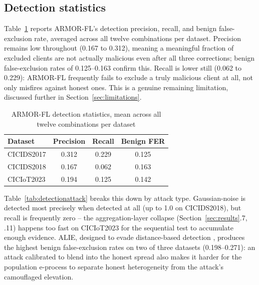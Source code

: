 \documentclass[pdflatex,iicol,sn-mathphys-num]{sn-jnl}%
\theoremstyle{thmstyleone}%
\theoremstyle{thmstyletwo}%
\theoremstyle{thmstylethree}%
\begin{document}
\subsection{Detection statistics}

Table~\ref{tab:detection} reports ARMOR-FL's detection precision, recall, and benign false-exclusion rate, averaged across all twelve combinations per dataset. Precision remains low throughout (0.167 to 0.312), meaning a meaningful fraction of excluded clients are not actually malicious even after all three corrections; benign false-exclusion rates of 0.125--0.163 confirm this. Recall is lower still (0.062 to 0.229): ARMOR-FL frequently fails to exclude a truly malicious client at all, not only misfires against honest ones. This is a genuine remaining limitation, discussed further in Section~\ref{sec:limitations}.

\begin{table}[htbp]
\centering
\caption{ARMOR-FL detection statistics, mean across all twelve combinations per dataset}\label{tab:detection}
\footnotesize
\begin{tabular}{@{}lccc@{}}
\toprule
Dataset & Precision & Recall & Benign FER \\
\midrule
CICIDS2017 & 0.312 & 0.229 & 0.125 \\
CICIDS2018 & 0.167 & 0.062 & 0.163 \\
CICIoT2023 & 0.194 & 0.125 & 0.142 \\
\bottomrule
\end{tabular}
\end{table}

Table~\ref{tab:detectionattack} breaks this down by attack type. Gaussian-noise is detected most precisely when detected at all (up to 1.0 on CICIDS2018), but recall is frequently zero -- the aggregation-layer collapse (Section~\ref{sec:results}.7, .11) happens too fast on CICIoT2023 for the sequential test to accumulate enough evidence. ALIE, designed to evade distance-based detection \citep{baruch2019alie}, produces the highest benign false-exclusion rates on two of three datasets (0.198--0.271): an attack calibrated to blend into the honest spread also makes it harder for the population e-process to separate honest heterogeneity from the attack's camouflaged elevation.
\end{document}
